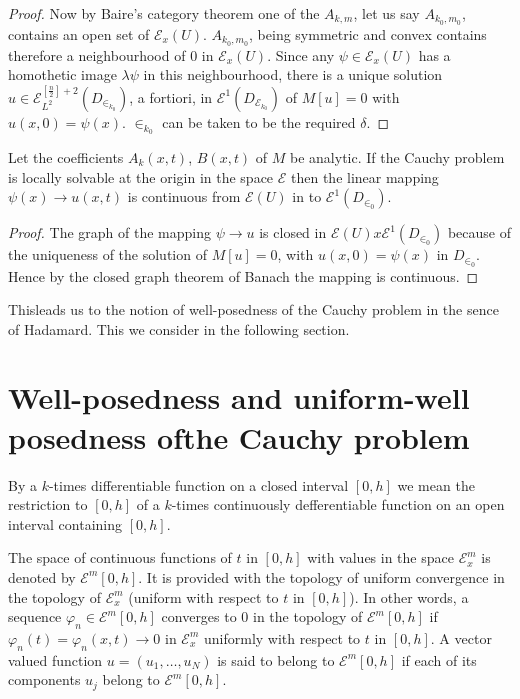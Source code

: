 \begin{proof}
Now by Baire's category theorem one of the $ A_{k, m}$, let us say $
A_{k_0,  m_0}$,  contains an open set of $\mathscr{E}_x (U)$.
$A_{k_0,  m_0}$,  being symmetric and convex contains therefore a
neighbourhood of 0 in $\mathscr{E}_x (U)$. Since any $ \psi \in
\mathscr{E}_x (U) $ has a homothetic image $\lambda \psi$ in this
neighbourhood,  there is a unique solution $u \in
\mathscr{E}_{L^2}^{[\frac{n}{2}]+2}(D_{\in _{k_0}})$, a fortiori,
in $\mathscr{E}^1 (D_{\mathscr{E}_{k_{0}}})$ of $ M [u] = 0$ with $ u(x,  0) =
\psi (x)$. $\in_{k_0}$ can be taken to be the required $ \delta$.   
\end{proof}

\setcounter{theorem}{0}
\begin{theorem}\label{chap2-sec1-thm1} %
Let the coefficients $ A_k (x, t)$, $B(x, t)$ of $M $ be analytic. If
the Cauchy problem is locally solvable at the origin in the space
$\mathscr{E}$ then the linear mapping $\psi (x) \to u (x,  t)$ is
continuous from $\mathscr{E} ( U) $ in to $\mathscr{E}^1 (D_{\in _0})$. 
\end{theorem}

\begin{proof}
The graph of the mapping $ \psi \to u$ is closed in $ \mathscr{E} ( U)
x \mathscr{E}^1 (D_{\in _0} )$ because of the uniqueness of the
solution of $ M [u ] = 0$,  with $ u(x,  0) = \psi (x)$ in $ D_{\in
  _0}$. Hence by the closed graph theorem of Banach the mapping is
continuous. 
\end{proof}

This\pageoriginale leads us to the notion of well-posedness of the
Cauchy problem in the sence of Hadamard. This we consider in the
following section.   

\section[Well-posedness and uniform-well
  posedness.....]{Well-posedness and uniform-well posedness
  of\hfill\break the Cauchy problem}\label{chap2-sec2} 

By a $k$-times differentiable function on a closed interval $ [0,  h]$
we mean the restriction to $ [0,  h]$ of a $k$-times continuously
defferentiable function on an open interval containing $ [0,  h]$.  

The space of continuous functions of $t$ in $ [0,  h]$ with values in
the space $\mathscr{E}^m _x$ is denoted by $ \mathscr{E}^m [ 0,
  h]$. It is provided with the topology of uniform convergence in the
topology of $ \mathscr{E}^m_x$ (uniform with respect to  $t$ in $[0,
  h]$). In other words,  a sequence $ \varphi_n \in \mathscr{E}^m [ 0,
  h]$ converges to 0 in the topology of $\mathscr{E}^m [ 0, h]$ if 
$\varphi_{n}(t)=\varphi_n (x,  t) \to 0$ in $\mathscr{E}^m_x$
uniformly with respect 
to $t$ in $ [0, h]$. A vector valued function $ u = (u_1,  \ldots ,
u_N)$ is said to belong to $\mathscr{E}^m [0,  h]$ if each of its
components $u_j$ belong to $\mathscr{E}^m [0,  h]$.  

